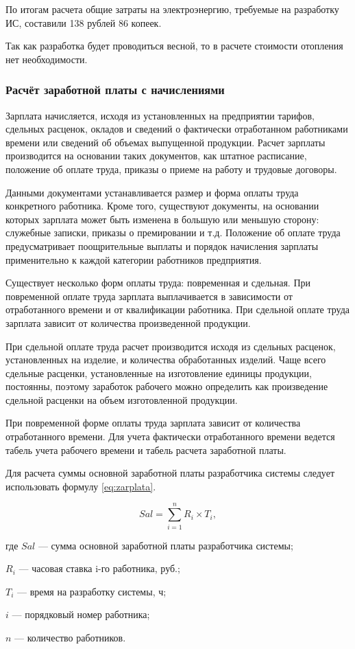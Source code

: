 По итогам расчета общие затраты на электроэнергию, требуемые на разработку ИС, составили 138 рублей 86 копеек.

Так как разработка будет проводиться весной, то в расчете стоимости отопления нет необходимости.

\subsubsection{Расчёт заработной платы с начислениями}

Зарплата начисляется, исходя из установленных на предприятии тарифов, сдельных расценок, окладов и сведений о фактически отработанном работниками времени или сведений об объемах выпущенной продукции.
Расчет зарплаты производится на основании таких документов, как штатное расписание, положение об оплате труда, приказы о приеме на работу и трудовые договоры.

Данными документами устанавливается размер и форма оплаты труда конкретного работника.
Кроме того, существуют документы, на основании которых зарплата может быть изменена в большую или меньшую сторону: служебные записки, приказы о премировании и т.д.
Положение об оплате труда предусматривает поощрительные выплаты и порядок начисления зарплаты применительно к каждой категории работников предприятия. 

Существует несколько форм оплаты труда: повременная и сдельная. При повременной оплате труда зарплата выплачивается в зависимости от отработанного времени и от квалификации работника.
При сдельной оплате труда зарплата зависит от количества произведенной продукции. 

При сдельной оплате труда расчет производится исходя из сдельных расценок, установленных на изделие, и количества обработанных изделий. Чаще всего сдельные расценки, установленные на изготовление единицы продукции, постоянны, поэтому заработок рабочего можно определить как произведение сдельной расценки на объем изготовленной продукции.

При повременной форме оплаты труда зарплата зависит от количества отработанного времени. Для учета фактически отработанного времени ведется табель учета рабочего времени и табель расчета заработной платы.

Для расчета суммы основной заработной платы разработчика системы следует использовать формулу \ref{eq:zarplata}. 

\begin{equation}
	\label{eq:zarplata}
	Sal =  \sum^{n}_{i=1} R_i \times T_i,
\end{equation}
\begin{ESKDexplanation}
	\item где $Sal$ --- сумма основной заработной платы разработчика системы;
	\item $R_i$ --- часовая ставка i-го работника, руб.;
	\item $T_{i}$ --- время на разработку системы, ч;
	\item $i$ --- порядковый номер работника;
	\item $n$ --- количество работников.
\end{ESKDexplanation}

